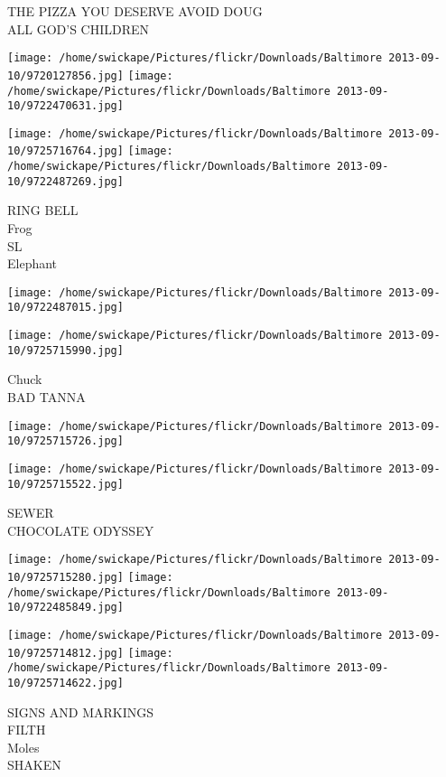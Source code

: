 \documentclass[10pt,letterpaper]{article}
\begin{document}
THE PIZZA YOU DESERVE AVOID DOUG\\
ALL GOD'S CHILDREN\\
\pagebreak

\texttt{[image: /home/swickape/Pictures/flickr/Downloads/Baltimore 2013-09-10/9720127856.jpg]}
\texttt{[image: /home/swickape/Pictures/flickr/Downloads/Baltimore 2013-09-10/9722470631.jpg]}

\texttt{[image: /home/swickape/Pictures/flickr/Downloads/Baltimore 2013-09-10/9725716764.jpg]}
\texttt{[image: /home/swickape/Pictures/flickr/Downloads/Baltimore 2013-09-10/9722487269.jpg]}

RING BELL\\
Frog\\
SL\\
Elephant\\
\pagebreak

\texttt{[image: /home/swickape/Pictures/flickr/Downloads/Baltimore 2013-09-10/9722487015.jpg]}

\vspace{0.25in}
\texttt{[image: /home/swickape/Pictures/flickr/Downloads/Baltimore 2013-09-10/9725715990.jpg]}

Chuck\\
BAD TANNA\\
\pagebreak

\texttt{[image: /home/swickape/Pictures/flickr/Downloads/Baltimore 2013-09-10/9725715726.jpg]}

\vspace{0.25in}
\texttt{[image: /home/swickape/Pictures/flickr/Downloads/Baltimore 2013-09-10/9725715522.jpg]}

SEWER\\
CHOCOLATE ODYSSEY\\
\pagebreak

\texttt{[image: /home/swickape/Pictures/flickr/Downloads/Baltimore 2013-09-10/9725715280.jpg]}
\texttt{[image: /home/swickape/Pictures/flickr/Downloads/Baltimore 2013-09-10/9722485849.jpg]}

\texttt{[image: /home/swickape/Pictures/flickr/Downloads/Baltimore 2013-09-10/9725714812.jpg]}
\texttt{[image: /home/swickape/Pictures/flickr/Downloads/Baltimore 2013-09-10/9725714622.jpg]}

SIGNS AND MARKINGS\\
FILTH\\
Moles\\
SHAKEN\\
\pagebreak
\end{document}

